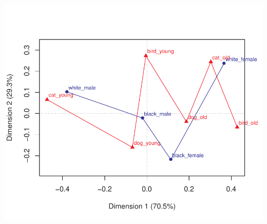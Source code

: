 \documentclass[10pt]{report}\usepackage[]{graphicx}\usepackage[]{color}
\newenvironment{knitrout}{}{} %
\renewenvironment{knitrout}{\small\renewcommand{\baselinestretch}{.85}}{} %
\begin{document}
\begin{Exercises}
\begin{enumerate*}
\begin{ans}
\begin{knitrout}
\centerline{\includegraphics[width=.5\textwidth]{soln/fig/ex6_8b-1} }



\end{knitrout}
    \end{ans}
    
  \end{enumerate*}
  

\end{Exercises}
\end{document}
